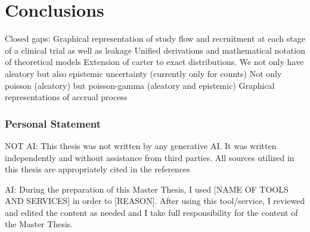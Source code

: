 

\chapter{Conclusions}

Closed gaps:
Graphical representation of study flow and recruitment at each stage of a clinical trial as well as leakage
Unified derivations and mathematical notation of theoretical models
Extension of carter to exact distributions. 
We not only have aleatory but also epistemic uncertainty (currently only for counts)
Not only poisson (aleatory) but poisson-gamma (aleatory and epistemic)
Graphical representations of accrual process

\subsection{Personal Statement}

NOT AI:
This thesis was not written by any generative AI. It was written independently and
without assistance from third parties. All sources utilized in this thesis are appropriately cited in the references

AI:
During the preparation of this Master Thesis, I used [NAME OF TOOLS AND SERVICES] in order to [REASON]. After using this tool/service, I reviewed and edited the content as needed and I take full responsibility for the content of the Master Thesis.



